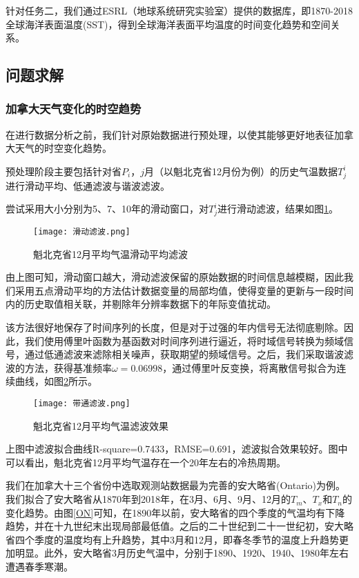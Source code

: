 \documentclass[bwprint]{gmcmthesis}
\begin{document}
针对任务二，我们通过ESRL（地球系统研究实验室）提供的数据库，即1870-2018全球海洋表面温度(SST)，得到全球海洋表面平均温度的时间变化趋势和空间关系。

\subsection{问题求解}

\subsubsection{加拿大天气变化的时空趋势}

在进行数据分析之前，我们针对原始数据进行预处理，以使其能够更好地表征加拿大天气的时空变化趋势。

预处理阶段主要包括针对省$P_i$，$j$月（以魁北克省12月份为例）的历史气温数据$T^i_j$进行滑动平均、低通滤波与谐波滤波。

尝试采用大小分别为5、7、10年的滑动窗口，对$T^i_j$进行滑动滤波，结果如图\ref{slidewindow}。

\begin{figure}[ht]
\centering
\texttt{[image: 滑动滤波.png]}
\caption{魁北克省12月平均气温滑动平均滤波}\label{slidewindow}
\end{figure}

由上图可知，滑动窗口越大，滑动滤波保留的原始数据的时间信息越模糊，因此我们采用五点滑动平均的方法估计数据变量的局部均值，使得变量的更新与一段时间内的历史取值相关联，并剔除年分辨率数据下的年际变值扰动。

该方法很好地保存了时间序列的长度，但是对于过强的年内信号无法彻底剔除。因此，我们使用傅里叶函数为基函数对时间序列进行逼近，将时域信号转换为频域信号，通过低通滤波来滤除相关噪声，获取期望的频域信号。之后，我们采取谐波滤波的方法，获得基准频率$\omega = 0.06998$，通过傅里叶反变换，将离散信号拟合为连续曲线，如图\ref{filter}所示。

\begin{figure}[ht]
\centering
\texttt{[image: 带通滤波.png]}
\caption{魁北克省12月平均气温滤波效果}\label{filter}
\end{figure}

上图中滤波拟合曲线R-square=0.7433，RMSE=0.691，滤波拟合效果较好。图中可以看出，魁北克省12月平均气温存在一个20年左右的冷热周期。

我们在加拿大十三个省份中选取观测站数据最为完善的安大略省(Ontario)为例。我们拟合了安大略省从1870年到2018年，在3月、6月、9月、12月的$T_m$、$T_x$和$T_n$的变化趋势。由图\ref{ON}可知，在1890年以前，安大略省的四个季度的气温均有下降趋势，并在十九世纪末出现局部最低值。之后的二十世纪到二十一世纪初，安大略省四个季度的温度均有上升趋势，其中3月和12月，即春冬季节的温度上升趋势更加明显。此外，安大略省3月历史气温中，分别于1890、1920、1940、1980年左右遭遇春季寒潮。
\end{document}
